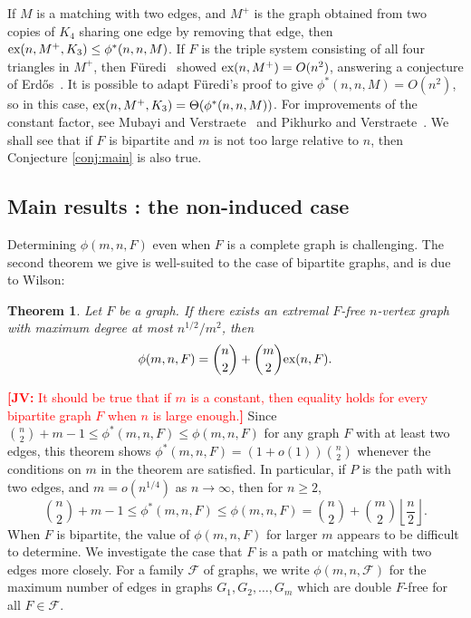 \documentclass[12pt]{article}
\newcommand{\jv}[1]{\textcolor{red}{\textbf{[JV: } #1\textbf{]}}}
\newtheorem{theorem}{Theorem}
\newcommand*{\ex}{\textnormal{ex}}
\begin{document}
If $M$ is a matching with two edges, and $M^+$ is the graph obtained from two copies of $K_4$ sharing one edge by removing that edge, then $\ex(n,M^+,K_3) \leq \phi^*(n,n,M)$. If $F$ is the triple system consisting of all four triangles in $M^+$, then F\"{u}redi~\cite{Furedi1984} showed $\ex(n,M^+) = O(n^2)$, answering a conjecture of Erd\H{o}s~\cite{Erdos1977}. It is possible to adapt F\"{u}redi's proof to give $\phi^*(n,n,M) = O(n^2)$, so in this case, $\ex(n,M^+,K_3) = \Theta(\phi^*(n,n,M))$. For improvements of the constant factor, see Mubayi and Verstraete~\cite{MubayiV2004} and Pikhurko and Verstraete~\cite{PikhurkoV2009}. We shall see that if $F$ is bipartite and $m$ is not too large relative to $n$, then Conjecture \ref{conj:main} is also true. 

\subsection{Main results : the non-induced case}

Determining $\phi(m,n,F)$ even when $F$ is a complete graph is challenging. The second theorem we give is well-suited to the case of bipartite graphs, and is due to Wilson:

\begin{theorem}\label{wilsontheorem}
    Let $F$ be a graph. 
    If
there exists an extremal $F$-free $n$-vertex graph with maximum degree at most $n^{1/2}/m^2$, then 
  \[ \phi(m,n,F) = \binom{n}{2} + \binom{m}{2}\ex(n,F).\]
\end{theorem}

\jv{It should be true that if $m$ is a constant, then  equality holds for every bipartite graph $F$ when $n$ is large enough.}
Since $\binom{n}{2} + m - 1 \leq \phi^*(m,n,F) \leq \phi(m,n,F)$ for any graph $F$ with at least two edges, this theorem shows $\phi^*(m,n,F) = (1 + o(1))\binom{n}{2}$ whenever the conditions on $m$ in the theorem are satisfied. In particular, if $P$ is the path with two edges, and $m = o(n^{1/4})$ as $n \rightarrow \infty$, then for $n \geq 2$, 
\[ 
  \binom{n}{2} + m - 1 \leq \phi^*(m,n,F) \leq \phi(m,n,F) = \binom{n}{2} + \binom{m}{2} \left\lfloor \frac{n}{2}\right\rfloor. 
\]
When $F$ is bipartite, the value of $\phi(m,n,F)$ for larger $m$ appears to be difficult to determine. We investigate the case that $F$ is a path or matching with two edges more closely. For a family $\mathcal{F}$ of graphs, we write $\phi(m,n,\mathcal{F})$ for the maximum number of edges in graphs $G_1,G_2,\dots,G_m$ which are double $F$-free for all $F \in \mathcal{F}$. 
\end{document}
